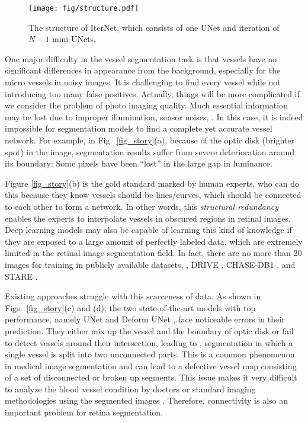 \documentclass[10pt,twocolumn,letterpaper]{article}
\begin{document}
\begin{figure*}
	\centering
	\texttt{[image: fig/structure.pdf]}
	\caption{The structure of IterNet, which consists of one UNet and iteration of $N-1$ mini-UNets.}
	\label{fig_structure}
\end{figure*}

One major difficulty in the vessel segmentation task is that vessels have no significant differences in appearance from the background, especially for the micro vessels in noisy images. It is challenging to find every vessel while not introducing too many false positives. Actually, things will be more complicated if we consider the problem of photo imaging quality. Much essential information may be lost due to improper illumination, sensor noises, \etc. In this case, it is indeed impossible for segmentation models to find a complete yet accurate vessel network. For example, in Fig.~\ref{fig_story}(a), because of the optic disk (brighter spot) in the image, segmentation results suffer from severe deterioration around its boundary: Some pixels have been ``lost'' in the large gap in luminance. 

Figure \ref{fig_story}(b) is the gold standard marked by human experts, who can do this because they know vessels should be lines/curves, which should be connected to each other to form a network. In other words, this \emph{structural redundancy} enables the experts to interpolate vessels in obscured regions in retinal images. Deep learning models may also be capable of learning this kind of knowledge if they are exposed to a large amount of perfectly labeled data, which are extremely limited in the retinal image segmentation field. In fact, there are no more than 20 images for training in publicly available datasets, \ie, DRIVE \cite{staal:2004-855}, CHASE-DB1 \cite{owen2009measuring}, and STARE \cite{845178}. 

Existing approaches struggle with this scarceness of data. As shown in Figs.~\ref{fig_story}(c) and (d), the two state-of-the-art models with top performance, namely UNet \cite{UNet} and Deform UNet \cite{JIN2019}, face noticeable errors in their prediction. They either mix up the vessel and the boundary of optic disk or fail to detect vessels around their intersection, leading to \eg, segmentation in which a single vessel is split into two unconnected parts. This is a common phenomenon in medical image segmentation and can lead to a defective vessel map consisting of a set of disconnected or broken up segments. This issue makes it very difficult to analyze the blood vessel condition by doctors or standard imaging methodologies using the segmented images \cite{7319356}. Therefore, connectivity is also an important problem for retina segmentation.
\end{document}
